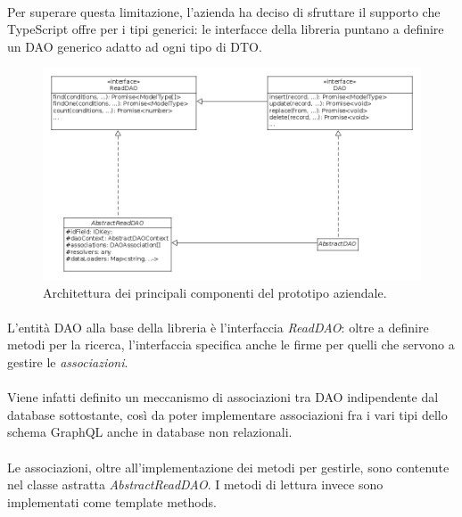 \documentclass[a4paper, 12pt]{report}
\begin{document}
      \paragraph*{}
      Per superare questa limitazione, l'azienda ha deciso di sfruttare il supporto che TypeScript offre per i tipi generici: le interfacce della libreria puntano a definire un DAO generico adatto ad ogni tipo di DTO.
      \begin{figure}[H]
        \includegraphics[width=\textwidth]{prototype-architecture.png}
        \caption{Architettura dei principali componenti del prototipo aziendale.}
      \end{figure}
      \paragraph*{}
      L'entità DAO alla base della libreria è l'interfaccia \emph{ReadDAO}: oltre a definire metodi per la ricerca, l'interfaccia specifica anche le firme per quelli che servono a gestire le \emph{associazioni}.
      \paragraph*{}
      Viene infatti definito un meccanismo di associazioni tra DAO indipendente dal database sottostante, così da poter implementare associazioni fra i vari tipi dello schema GraphQL anche in database non relazionali.
      \paragraph*{}
      Le associazioni, oltre all'implementazione dei metodi per gestirle, sono contenute nel classe astratta \emph{AbstractReadDAO}.
      I metodi di lettura invece sono implementati come template methods.
\end{document}
